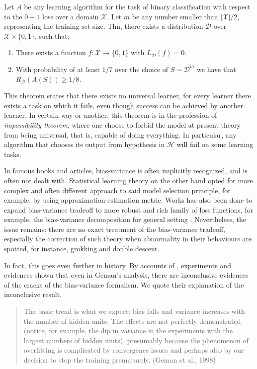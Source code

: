 \begin{theorem}
    Let $A$ be any learning algorithm for the task of binary classification with respect to the $0-1$ loss over a domain $\mathcal{X}$. Let $m$ be any number smaller than $|\mathcal{X}|/2$, representing the training set size. Thn, there exists a distribution $\mathcal{D}$ over $\mathcal{X}\times \{0,1\}$, such that: 
    \begin{enumerate}
        \item There exists a function $f:\mathcal{X}\to \{0,1\}$ with $L_{\mathcal{D}}(f)= 0$. 
        \item With probability of at least $1/7$ over the choice of $S\sim \mathcal{D}^{m}$ we have that $R_{\mathcal{D}}(A(S))\geq 1/8$. 
    \end{enumerate}
\end{theorem}

This theorem states that there exists no universal learner, for every learner there exists a task on which it fails, even though success can be achieved by another learner. In certain way or another, this theorem is in the profession of \textit{impossibility theorem}, where one choose to forbid the model at present theory from being universal, that is, capable of doing everything. In particular, any algorithm that chooses its output from hypothesis in $\mathcal{H}$ will fail on some learning tasks. 

In famous books and articles, bias-variance is often implicitly recognized, and is often not dealt with. Statistical learning theory on the other hand opted for more complex and often different approach to said model selection principle, for example, by using approximation-estimation metric. Works has also been done to expand bias-variance tradeoff to more robust and rich family of loss functions, for example, the bias-variance decomposition for general setting \cite{PfauBregmanDivergence,buschjager_generalized_2020,unified_bias_composition}. Nevertheless, the issue remains: there are no exact treatment of the bias-variance tradeoff, especially the correction of such theory when abnormality in their behaviours are spotted, for instance, grokking and double descent. 

In fact, this goes even further in history. By accounts of \cite{neal2019biasvariancetradeofftextbooksneed}, experiments and evidences shown that even in Geman's analysis, there are inconclusive evidences of the cracks of the bias-variance formalism. We quote their explanation of the inconclusive result. 
\begin{quote}
    The basic trend is what we expect: bias falls and variance increases with the number of hidden units. The effects are not perfectly demonstrated (notice, for example, the dip in variance in the experiments with the largest numbers of hidden units), presumably because the phenomenon of overfitting is complicated by convergence issues and perhaps also by our decision to stop the training prematurely. (Geman et al., 1998)
\end{quote}

